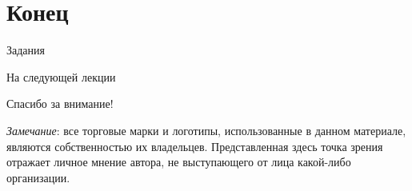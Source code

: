 \section{Конец}

\begin{frame}{Задания}
\end{frame}

\begin{frame}{На следующей лекции}
\end{frame}

\begin{frame}

{\huge{Спасибо за внимание!}\par}

\vfill

\tiny{\textit{Замечание}: все торговые марки и логотипы, использованные в данном материале, являются собственностью их владельцев. Представленная здесь точка зрения отражает личное мнение автора, не выступающего от лица какой-либо организации.}

\end{frame}

